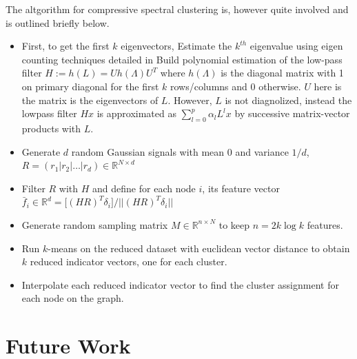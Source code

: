 \documentclass[10pt,a4paper, nocenter]{report}
\newcommand{\norm}[1]{\lvert\lvert {#1} \rvert\rvert}
\begin{document}
    The altgorithm for compressive spectral clustering is, however quite involved and is outlined briefly below. 

    \begin{itemize}
        \item First, to get the first $k$ eigenvectors,  
            \subitem Estimate the $k^{th}$ eigenvalue using eigen counting techniques detailed in \cite{Di13efficientestimation} 
            \subitem Build polynomial estimation of the low-pass filter $H := h(L) = U h(\Lambda) U^T$ where $h({\Lambda})$ is the diagonal matrix with 1 on primary diagonal for the first $k$ rows/columns and 0 otherwise. $U$ here is the matrix is the eigenvectors of $L$. However, $L$ is not diagnolized, instead the lowpass filter $Hx$ is approximated as $\sum_{l=0}^{p}\alpha_l L^{l}x$ by successive matrix-vector products with $L$.
        \item  Generate $d$ random Gaussian signals with mean $0$ and variance $1/d$, $R = (r_1|r_2|\dots|r_d) \in \mathbb{R}^{N\times d}$
        \item Filter $R$ with $H$ and define for each node $i$, its feature vector $\bar{f}_i \in \mathbb{R}^d = \big[ (HR)^T \delta_i \big] / \norm{(HR)^T \delta_i} $
        \item Generate random sampling matrix $M\in \mathbb{R}^{n\times N}$ to keep $n=2k \log{k}$ features. 
        \item Run $k$-means on the reduced dataset with euclidean vector distance to obtain $k$ reduced indicator vectors, one for each cluster. 
        \item Interpolate each reduced indicator vector to find the cluster assignment for each node on the graph.
    \end{itemize}

    \chapter{Future Work}
    

    \appendix
\end{document}
